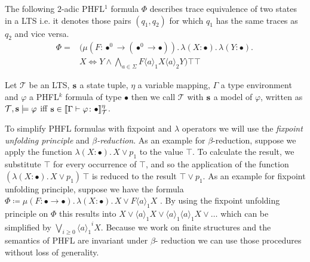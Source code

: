 \begin{example}{\cite{lange2014capturing}}
   \label{example:phfl_order_2}
   The following $2$-adic PHFL$^1$ formula $\Phi$ describes trace equivalence of two states in a LTS i.e. it denotes
   those pairs $(q_1, q_2)$ for which $q_1$ has the same traces as $q_2$ and vice versa.
    \begin{align*}
        \Phi = &(\mu (F \colon \bullet^0 \rightarrow (\bullet^0 \rightarrow \bullet)).\,
        \lambda (X \colon \bullet).\, \lambda (Y \colon \bullet).\, \\&X \Leftrightarrow Y \wedge
        \underset{a \in \Sigma}{\bigwedge} F \langle a \rangle_1 X \langle a \rangle_2 Y)\top \top
    \end{align*}
\end{example}

\begin{definition}
    Let $\mathcal{T}$ be an LTS, $\emph{s}$ a state tuple, $\eta$ a variable mapping, $\Gamma$ a type environment and
    $\varphi$ a PHFL$^k$ formula of type $\bullet$ then we call $\mathcal{T}$ with $\emph{s}$ a model of $\varphi$,
    written as $\mathcal{T}, \emph{s} \models \varphi$ iff $\emph{s} \in \llbracket \Gamma
    \vdash \varphi \colon \bullet \rrbracket^\eta_\mathcal{T}$.
\end{definition}

\begin{remark}
To simplify PHFL formulas with fixpoint and $\lambda$ operators we will use the \emph{fixpoint unfolding principle} and \emph{$\beta$-reduction}. As an example for $\beta$-reduction, 
suppose we apply the function $\lambda (X \colon \bullet). \,X \vee p_1$ to the value $\top$. To calculate the result, we substitute $\top$ for every occurrence of $\top$, and so the 
application of the function $(\lambda (X \colon \bullet). \,X \vee p_1) \, \top$ is reduced to the result $\top \vee p_1$. As an example for fixpoint unfolding principle, suppose we have the formula 
$\Phi \coloneqq \mu (F \colon \bullet \rightarrow \bullet).\,\lambda (X \colon \bullet).\, X \vee F \langle a \rangle_1 X$ . By using the fixpoint unfolding principle on $\Phi$ this results into 
$X \vee \langle a \rangle_1 X \vee \langle a \rangle_1 \langle a \rangle_1 X \vee \dots$ which can be simplified by ${\bigvee}_{i \geq 0} \langle a {\rangle_1}^i X$.  Because we work on finite structures and the semantics of PHFL are invariant under $\beta$-
reduction we can use those procedures without loss of generality.
\end{remark}

